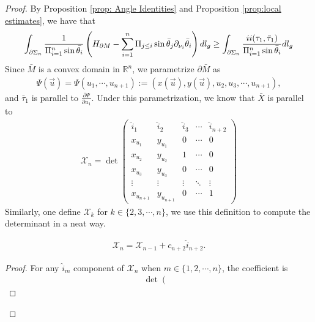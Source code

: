 \documentclass[10pt,a4paper]{amsart}
\newcommand{\RN}[1]{%
  \textup{\uppercase\expandafter{\romannumeral#1}}%
}
\begin{document}
\begin{proof}
    By Proposition \ref{prop: Angle Identities} and Proposition \ref{prop:local estimates}, we have that
    \begin{align*}
        \int_{\partial\Sigma_n}\frac{1}{\Pi_{i=1}^n\sin\bar{\theta_i}}\left(H_{\partial M}-\sum_{i=1}^n\Pi_{j\leq i}\sin\bar{\theta}_j\partial_{\nu_i}\bar{\theta}_i\right)dl_g\geq \int_{\partial\Sigma_n}\frac{\RN{2}(\tau_1,\bar{\tau}_1)}{\Pi_{i=1}^n\sin\bar{\theta}_i}dl_g
        \end{align*}
        Since $\bar{M}$ is a convex domain in $\mathbb R^n$, we parametrize $\partial \bar{M}$ as 
        \begin{align}
            \Psi(\vec{u})=\Psi(u_1,\cdots, u_{n+1}):=(x(\vec{u}),y(\vec{u}),u_2,u_3,\cdots, u_{n+1}),
        \end{align}
        and $\bar{\tau}_1$ is parallel to $\frac{\partial\Psi}{\partial u_1}$.
        Under this parametrization, we know that $\bar{X}$ is parallel to
        \begin{align*}
           \mathcal{X}_n=\det \left(\begin{matrix}
                \hat{i}_1 & \hat{i}_2 & \hat{i}_3 &\cdots &\hat{i}_{n+2}\\
                x_{u_1} & y_{u_1} & 0 &\cdots & 0\\
                x_{u_2} & y_{u_2} & 1 & \cdots & 0\\
                x_{u_3} &y_{u_3} &0 &\cdots & 0\\
                \vdots  & \vdots & \vdots &\ddots & \vdots\\
                x_{u_{n+1}} & y_{u_{n+1}} & 0 &\cdots & 1 
            \end{matrix}\right)
        \end{align*}
        Similarly, one define $\mathcal{X}_k$ for $k\in\{2,3,\cdots, n\}$, we use this definition to compute the determinant in a neat way.
        \begin{lem}
            \begin{align}\label{normalvecinduction1}
                \mathcal{X}_{n}=\mathcal{X}_{n-1}+c_{n+2}\hat{i}_{n+2}.
            \end{align}
        \end{lem}
        \begin{proof}
            For any $\hat{i}_{m}$ component of $\mathcal{X}_n$ when $m\in\{1,2,\cdots, n\}$, the coefficient is 
            \begin{align*}
                \det\left(\begin{matrix}

\end{matrix}
\end{align*}
\end{proof}
\end{proof}
\end{document}
